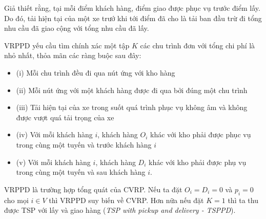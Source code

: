 Giả thiết rằng, tại mỗi điểm khách hàng, điểm giao được phục vụ trước điểm lấy. Do đó, tải hiện tại của một xe trướ khi tới điểm đã cho là tải ban đầu trừ đi tổng nhu cầu đã giao cộng với tổng nhu cầu đã lấy.

VRPPD yếu cầu tìm chính xác một tập $K$ các chu trình đơn với tổng chi phí là nhỏ nhất, thỏa mãn các ràng buộc sau đây:

\begin{itemize}
	\item[] (i) Mỗi chu trình đều đi qua nút ứng với kho hàng
	\item[] (ii) Mỗi nút ứng với một khách hàng được đi qua bởi đúng một chu trình
	\item[] (iii) Tải hiện tại của xe trong suốt quá trình phục vụ không âm và không được vượt quá tải trọng của xe
	\item[] (iv) Với mỗi khách hàng $i$, khách hàng $O_i$ khác với kho phải được phục vụ trong cùng một tuyến và trước khách hàng $i$
	\item[] (v) Với mỗi khách hàng $i$, khách hàng $D_i$ khác với kho phải được phụ vụ trong cùng một tuyến và sau khách hàng $i$.
\end{itemize}

VRPPD là trường hợp tổng quát của CVRP. Nếu ta đặt $O_i = D_i = 0$ và $p_i = 0$ cho mọi $i \in V$ thì VRPPD suy biến về CVRP. Hơn nữa nếu đặt $K=1$ thì ta thu được TSP với lấy và giao hàng (\textit{TSP with pickup and delivery - TSPPD}).
